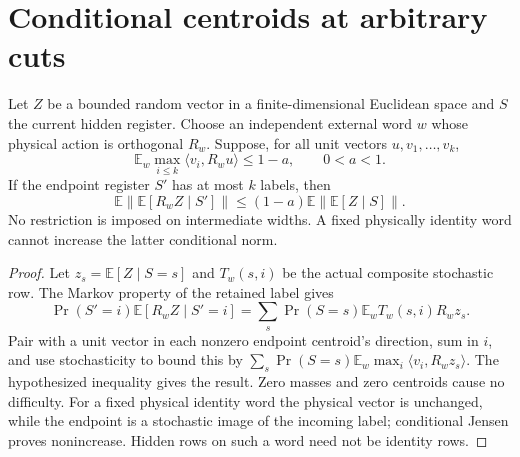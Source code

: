 \section{Conditional centroids at arbitrary cuts}
\begin{lemma}\label{lem:centroid54}
Let $Z$ be a bounded random vector in a finite-dimensional Euclidean
space and $S$ the current hidden register. Choose an independent external
word $w$ whose physical action is orthogonal $R_w$. Suppose, for all
unit vectors $u,v_1,\ldots,v_k$,
\[
 \mathbb E_w\max_{i\le k}\langle v_i,R_wu\rangle\le1-a,
                                  \qquad 0<a<1.
\]
If the endpoint register $S'$ has at most $k$ labels, then
\[
 \mathbb E\|\mathbb E[R_wZ\mid S']\|
                  \le(1-a)\mathbb E\|\mathbb E[Z\mid S]\|.
\]
No restriction is imposed on intermediate widths. A fixed physically
identity word cannot increase the latter conditional norm.
\end{lemma}
\begin{proof}
Let $z_s=\mathbb E[Z\mid S=s]$ and $T_w(s,i)$ be the actual composite
stochastic row. The Markov property of the retained label gives
\[
 \Pr(S'=i)\mathbb E[R_wZ\mid S'=i]
       =\sum_s\Pr(S=s)\mathbb E_w T_w(s,i)R_wz_s.
\]
Pair with a unit vector in each nonzero endpoint centroid's direction,
sum in $i$, and use stochasticity to bound this by
$\sum_s\Pr(S=s)\mathbb E_w\max_i\langle v_i,R_wz_s\rangle$.
The hypothesized inequality gives the result. Zero masses and zero
centroids cause no difficulty. For a fixed physical identity word the
physical vector is unchanged, while the endpoint is a stochastic image
of the incoming label; conditional Jensen proves nonincrease. Hidden
rows on such a word need not be identity rows.
\end{proof}
